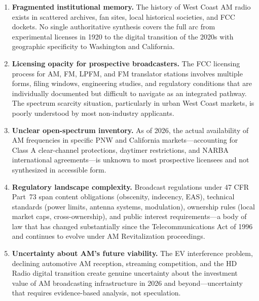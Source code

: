 \documentclass[11pt,letterpaper]{article}
\begin{document}
\begin{enumerate}[leftmargin=*, label=\textbf{\arabic*.}]
  \item \textbf{Fragmented institutional memory.} The history of West Coast AM radio exists in
        scattered archives, fan sites, local historical societies, and FCC dockets. No single
        authoritative synthesis covers the full arc from experimental licenses in 1920 to the
        digital transition of the 2020s with geographic specificity to Washington and California.

  \item \textbf{Licensing opacity for prospective broadcasters.} The FCC licensing process for
        AM, FM, LPFM, and FM translator stations involves multiple forms, filing windows, engineering
        studies, and regulatory conditions that are individually documented but difficult to navigate
        as an integrated pathway. The spectrum scarcity situation, particularly in urban West Coast
        markets, is poorly understood by most non-industry applicants.

  \item \textbf{Unclear open-spectrum inventory.} As of 2026, the actual availability of AM
        frequencies in specific PNW and California markets---accounting for Class A clear-channel
        protections, daytimer restrictions, and NARBA international agreements---is unknown to
        most prospective licensees and not synthesized in accessible form.

  \item \textbf{Regulatory landscape complexity.} Broadcast regulations under 47 CFR Part~73
        span content obligations (obscenity, indecency, EAS), technical standards (power limits,
        antenna systems, modulation), ownership rules (local market caps, cross-ownership), and
        public interest requirements---a body of law that has changed substantially since the
        Telecommunications Act of 1996 and continues to evolve under AM Revitalization proceedings.

  \item \textbf{Uncertainty about AM's future viability.} The EV interference problem, declining
        automotive AM reception, streaming competition, and the HD Radio digital transition create
        genuine uncertainty about the investment value of AM broadcasting infrastructure in 2026
        and beyond---uncertainty that requires evidence-based analysis, not speculation.
\end{enumerate}
\end{document}
